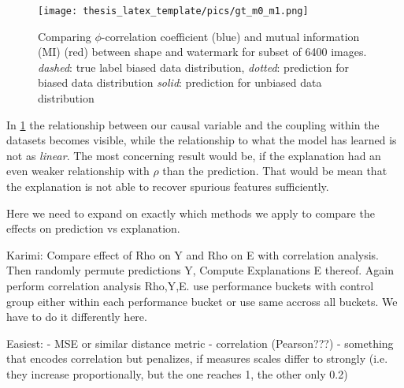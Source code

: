 \begin{figure}
    \centering
    \texttt{[image: thesis\_latex\_template/pics/gt\_m0\_m1.png]}
    \caption[$m_0$ vs. $m_1$]{Comparing $\phi$-correlation coefficient (blue) and mutual information (MI) (red) between shape and watermark for subset of 6400 images. \\ \textit{dashed}: true label biased data distribution, \textit{dotted}: prediction for biased data distribution \textit{solid}: prediction for unbiased data distribution }
    \label{fig:m0_m1}
\end{figure}

In \cref{fig:m0_m1} the relationship between our causal variable and the coupling within the datasets becomes visible, while the relationship to what the model has learned is not as \textit{linear}. The most concerning result would be, if the explanation had an even weaker relationship with $\rho$ than the prediction. That would be mean that the explanation is not able to recover spurious features sufficiently. 

Here we need to expand on exactly which methods we apply to compare the effects on prediction vs explanation. 

Karimi: Compare effect of Rho on Y and Rho on E with correlation analysis. Then randomly permute predictions Y, Compute Explanations E thereof. Again perform correlation analysis Rho,Y,E. 
use performance buckets with control group either within each performance bucket or use same accross all buckets. 
We have to do it differently here.

Easiest: 
- MSE or similar distance metric
- correlation (Pearson???)
- something that encodes correlation but penalizes, if measures scales differ to strongly (i.e. they increase proportionally, but the one reaches 1, the other only 0.2)


